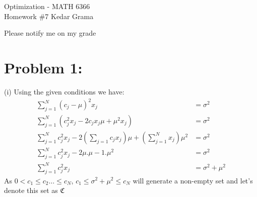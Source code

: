 \documentclass[12pt]{report}
\begin{document}
\begin{center}
	\large{Optimization - MATH 6366}\\
	\hfill \hfill \large{Homework \#7} \hfill \large{Kedar Grama}\\
\end{center}
Please notify me on my grade
\section*{Problem 1:}
(i) Using the given conditions we have:
\begin{align*}
\sum_{j=1}^{N} \left( c_j-\mu \right)^2x_j &= \sigma^2 \\
\sum_{j=1}^{N} \left( c_j^2x_j - 2c_jx_j \mu + \mu^2x_j \right) &= \sigma^2 \\
\sum_{j=1}^{N}c_j^2x_j - 2\left( \sum_{j=1}c_jx_j \right) \mu + \left( \sum_{j=1}^{N}x_j \right) \mu^2 &= \sigma^2 \\
\sum_{j=1}^{N}c_j^2x_j - 2\mu.\mu - 1.\mu^2 &= \sigma^2 \\
\sum_{j=1}^{N}c_j^2x_j &= \sigma^2+\mu^2
\end{align*}
As $0<c_1 \leq c_2 \dots \leq c_N $, $c_1 \leq \sigma^2+\mu^2 \leq c_N$ will generate a non-empty set and let's denote
this set as $\mathfrak{C}$
\end{document}
